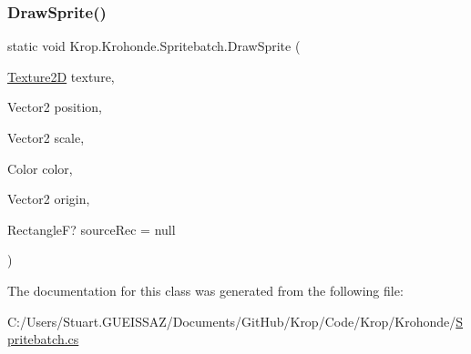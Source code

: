 \subsubsection{\texorpdfstring{Draw\+Sprite()}{DrawSprite()}\hspace{0.1cm}{\footnotesize\ttfamily [6/6]}}
{\footnotesize\ttfamily static void Krop.\+Krohonde.\+Spritebatch.\+Draw\+Sprite (\begin{DoxyParamCaption}\item[{\mbox{\hyperlink{class_krop_1_1_krohonde_1_1_texture2_d}{Texture2D}}}]{texture,  }\item[{Vector2}]{position,  }\item[{Vector2}]{scale,  }\item[{Color}]{color,  }\item[{Vector2}]{origin,  }\item[{RectangleF?}]{source\+Rec = {\ttfamily null} }\end{DoxyParamCaption})\hspace{0.3cm}{\ttfamily [static]}}



The documentation for this class was generated from the following file\+:\begin{DoxyCompactItemize}
\item 
C\+:/\+Users/\+Stuart.\+G\+U\+E\+I\+S\+S\+A\+Z/\+Documents/\+Git\+Hub/\+Krop/\+Code/\+Krop/\+Krohonde/\mbox{\hyperlink{_spritebatch_8cs}{Spritebatch.\+cs}}\end{DoxyCompactItemize}
